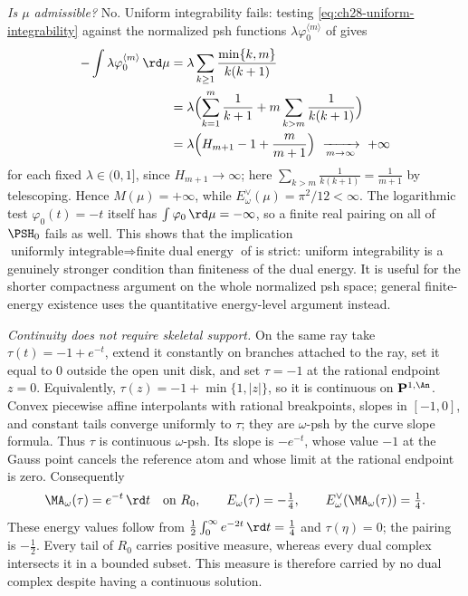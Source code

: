 \begin{example}
\emph{Is $\mu$ admissible?}  No.  Uniform integrability fails:
testing \eqref{eq:ch28-uniform-integrability} against the normalized psh
functions $\lambda\varphi_0^{\langle m\rangle}$ of
 gives
\[
 \begin{aligned}
 -\int\lambda\varphi_0^{\langle m\rangle}\,\rd\mu
 &=\lambda\sum_{k\geq1}\frac{\min\{k,m\}}{k(k+1)}\\
 &=\lambda\Bigl(\sum_{k=1}^{m}\frac1{k+1}
    +m\sum_{k>m}\frac1{k(k+1)}\Bigr)\\
 &=\lambda\Bigl(H_{m+1}-1+\frac{m}{m+1}\Bigr)
 \ \xrightarrow[m\to\infty]{}\ +\infty
 \end{aligned}
\]
for each fixed $\lambda\in(0,1]$, since $H_{m+1}\to\infty$; here
$\sum_{k>m}\frac1{k(k+1)}=\frac1{m+1}$ by telescoping.
Hence $M(\mu)=+\infty$, while $E^\vee_\omega(\mu)=\pi^2/12<\infty$.
The logarithmic test $\varphi_0(t)=-t$ itself has
$\int\varphi_0\,\rd\mu=-\infty$, so a finite real pairing on all of
$\PSH_0$ fails as well.
This shows that the implication
$\text{uniformly integrable}\Rightarrow\text{finite dual energy}$ of
 is strict: uniform integrability is a genuinely
stronger condition than finiteness of the dual energy.  It is useful for
the shorter compactness argument on the whole normalized psh space;
general finite-energy existence uses the quantitative energy-level
argument instead.

\emph{Continuity does not require skeletal support.}  On the same ray
take $\tau(t)=-1+e^{-t}$, extend it constantly on branches attached to
the ray, set it equal to $0$ outside the open unit disk, and set
$\tau=-1$ at the rational endpoint $z=0$.  Equivalently,
$\tau(z)=-1+\min\{1,|z|\}$, so it is continuous on $\mathbf P^{1,\An}$.
Convex piecewise affine interpolants with rational breakpoints, slopes
in $[-1,0]$, and constant tails converge uniformly to $\tau$; they are
$\omega$-psh by the curve slope formula.  Thus $\tau$ is continuous
$\omega$-psh.  Its slope is $-e^{-t}$, whose value $-1$ at the Gauss
point cancels the reference atom and whose limit at the rational
endpoint is zero.  Consequently
\[
 \MA_\omega(\tau)=e^{-t}\,\rd t\quad\text{on }R_0,\qquad
 E_\omega(\tau)=-\tfrac14,\qquad
 E_\omega^\vee(\MA_\omega(\tau))=\tfrac14.
\]
These energy values follow from
$\tfrac12\int_0^\infty e^{-2t}\,\rd t=\tfrac14$ and
$\tau(\eta)=0$; the pairing is $-\tfrac12$.
Every tail of $R_0$ carries positive measure, whereas every dual
complex intersects it in a bounded subset.  This measure is therefore
carried by no dual complex despite having a continuous solution.
\end{example}

